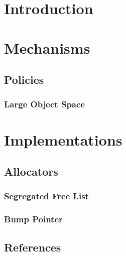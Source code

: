 \documentclass[11pt]{book}
\begin{document}
\part{Introduction}






%
%








\part{Mechanisms}




\chapter{Policies}

\section{Large Object Space}
\label{sec:policy:LargeObject}



\part{Implementations}

\chapter{Allocators}
\section{Segregated Free List}
\label{sec:alloc:free-list}

\section{Bump Pointer}
\label{sec:alloc:bump-pointer}





\chapter*{References}



\end{document}
